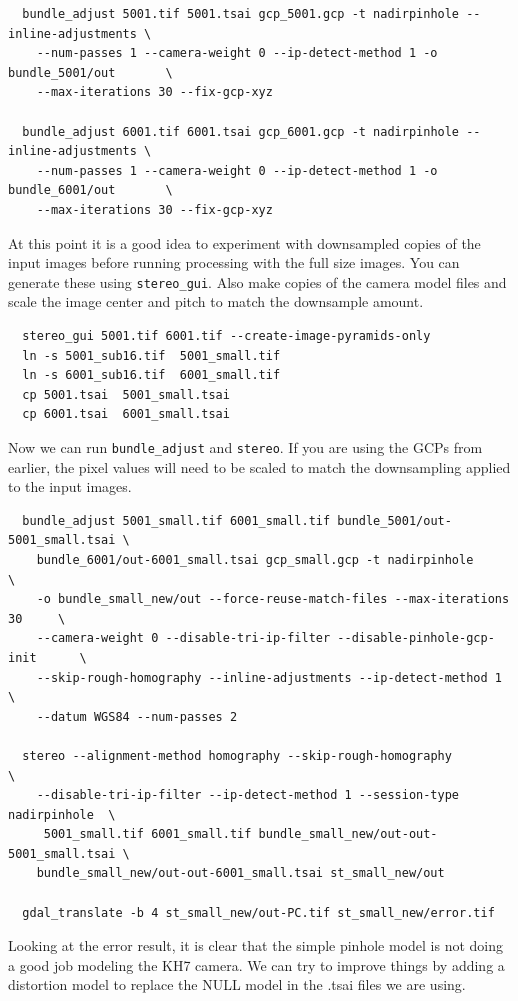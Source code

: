 \begin{verbatim}
  bundle_adjust 5001.tif 5001.tsai gcp_5001.gcp -t nadirpinhole --inline-adjustments \
    --num-passes 1 --camera-weight 0 --ip-detect-method 1 -o bundle_5001/out       \
    --max-iterations 30 --fix-gcp-xyz

  bundle_adjust 6001.tif 6001.tsai gcp_6001.gcp -t nadirpinhole --inline-adjustments \
    --num-passes 1 --camera-weight 0 --ip-detect-method 1 -o bundle_6001/out       \
    --max-iterations 30 --fix-gcp-xyz
\end{verbatim}

At this point it is a good idea to experiment with downsampled copies of the input
images before running processing with the full size images.  You can generate these 
using \texttt{stereo\_gui}.  Also make copies of the camera model
files and scale the image center and pitch to match the downsample amount.

\begin{verbatim}
  stereo_gui 5001.tif 6001.tif --create-image-pyramids-only
  ln -s 5001_sub16.tif  5001_small.tif
  ln -s 6001_sub16.tif  6001_small.tif
  cp 5001.tsai  5001_small.tsai
  cp 6001.tsai  6001_small.tsai
\end{verbatim}

Now we can run \texttt{bundle\_adjust} and \texttt{stereo}.  If you are using the
GCPs from earlier, the pixel values will need to be scaled to match the downsampling
applied to the input images.

\begin{verbatim}
  bundle_adjust 5001_small.tif 6001_small.tif bundle_5001/out-5001_small.tsai \
    bundle_6001/out-6001_small.tsai gcp_small.gcp -t nadirpinhole               \
    -o bundle_small_new/out --force-reuse-match-files --max-iterations 30     \
    --camera-weight 0 --disable-tri-ip-filter --disable-pinhole-gcp-init      \
    --skip-rough-homography --inline-adjustments --ip-detect-method 1         \
    --datum WGS84 --num-passes 2

  stereo --alignment-method homography --skip-rough-homography              \
    --disable-tri-ip-filter --ip-detect-method 1 --session-type nadirpinhole  \
     5001_small.tif 6001_small.tif bundle_small_new/out-out-5001_small.tsai \
    bundle_small_new/out-out-6001_small.tsai st_small_new/out

  gdal_translate -b 4 st_small_new/out-PC.tif st_small_new/error.tif
\end{verbatim}


Looking at the error result, it is clear that the simple pinhole model is not
doing a good job modeling the KH7 camera.  We can try to improve things by
adding a distortion model to replace the NULL model in the .tsai files we are using.


